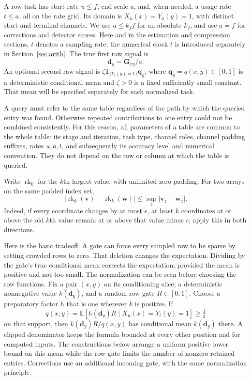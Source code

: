 \documentclass[11pt]{article}
\numberwithin{equation}{section}
\theoremstyle{definition}
\theoremstyle{remark}
\begin{document}
A row task has start rate $u\le f$, end scale $a$, and, when needed, a
usage rate $t\le a$, all on the rate grid.  Its domain is
$X_u(x)=Y_a(y)=1$, with distinct start and terminal channels.  We use
$a\le {k}_f f$ for an absolute ${k}_f$, and use $a=f$ for corrections and
detector scores.  Here and in the estimation and compression sections,
$t$ denotes a sampling rate; the numerical clock $t$ is introduced
separately in Section~\ref{sec:arith}.  The true first raw signal is
\begin{equation}
 {\mathbf{d}}_y={\mathbf{G}}_{xy}/a.
 \label{eq:atom-first-signal}
\end{equation}
An optional second raw signal is
$\zeta\mathbf1_{\{Y_t(y)=1\}}{\mathbf{q}}_y$, where ${\mathbf{q}}_y=q(x,y)\in[0,1]$ is a
deterministic conditional mean and $\zeta>0$ is a fixed sufficiently small
constant.  That mean will be specified separately for each normalized task.

A query must refer to the same table regardless of the path by which the queried entry was found. Otherwise repeated contributions to one entry could not be combined consistently. For this reason, all parameters of a table are common to the whole table: its stage and
iteration, task type, channel roles, channel padding suffixes, rates
$u,a,t$, and subsequently its accuracy level and numerical convention.  They do
not depend on the row or column at which the table is queried.

Write $\operatorname{rk}_k$ for the $k$th largest value, with unlimited
zero padding.  For two arrays on the same padded index set,
\begin{equation}
 |\operatorname{rk}_k({\mathbf{v}})-\operatorname{rk}_k({\mathbf{w}})|
 \le\sup_z|{\mathbf{v}}_z-{\mathbf{w}}_z|.
 \label{eq:atom-rank-lipschitz}
\end{equation}
Indeed, if every coordinate changes by at most $\epsilon$, at least $k$
coordinates at or above the old $k$th value remain at or above that value
minus $\epsilon$; apply this in both directions.

Here is the basic tradeoff. A gate can force every sampled row to be sparse by setting crowded rows to zero. That deletion changes the expectation. Dividing by the gate's true conditional mean corrects the expectation, provided the mean is positive and not too small. The normalization can be seen before choosing the row functions.  Fix a
pair $(x,y)$ on its conditioning slice, a deterministic nonnegative value
$k({\mathbf{d}}_y)$, and a random row gate $R\in[0,1]$.  Choose a preparatory factor
$h$ that is one wherever $k$ is positive.  If
\[
 q(x,y)=\mathbb E[h({\mathbf{d}}_y)R\mid X_u(x)=Y_t(y)=1]\ge\tfrac12
\]
on that support, then $k({\mathbf{d}}_y)R/q(x,y)$ has conditional mean $k({\mathbf{d}}_y)$
there.  A clipped denominator keeps the formula bounded at every other
position and for computed inputs.  The constructions below arrange a
uniform positive lower bound on this mean while the row gate limits the
number of nonzero retained entries.  Corrections use an additional incoming
gate, with the same normalization principle.
\end{document}
